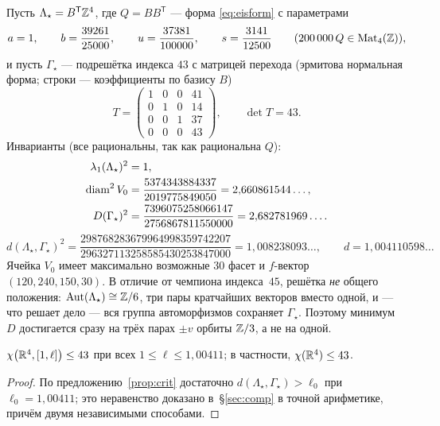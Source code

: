 Пусть $\Lambda_\star=B^{\mathsf T}\mathbb{Z}^4$, где $Q=BB^{\mathsf T}$ --- форма
\eqref{eq:eisform} с параметрами
\begin{equation}\label{eq:gram43}
a=1,\qquad b=\frac{39261}{25000},\qquad u=\frac{37381}{100000},\qquad
s=\frac{3141}{12500}
\qquad(200\,000\,Q\in\mathrm{Mat}_4(\mathbb{Z})),
\end{equation}
и пусть $\Gamma_\star$ --- подрешётка индекса $43$ с матрицей перехода
(эрмитова нормальная форма; строки --- коэффициенты по базису $B$)
\begin{equation}\label{eq:hnf43}
T=\begin{pmatrix}1&0&0&41\\0&1&0&14\\0&0&1&37\\0&0&0&43\end{pmatrix},
\qquad\det T=43 .
\end{equation}
Инварианты (все рациональны, так как рациональна $Q$):
\[
\begin{aligned}
\lambda_1(\Lambda_\star)^2&=1,\\
\operatorname{diam}^2V_0&=\frac{5374343884337}{2019775849050}
  =2{,}660861544\ldots,\\
D(\Gamma_\star)^2&=\frac{7396075258066147}{2756867811550000}
  =2{,}682781969\ldots.
\end{aligned}
\]
\[
d(\Lambda_\star,\Gamma_\star)^2
=\frac{298768283679964998359742207}{296327113258585430253847000}
=1{,}008238093\ldots,\qquad
d=1{,}004110598\ldots
\]
Ячейка $V_0$ имеет максимально возможные $30$ фасет и $f$-вектор
$(120,240,150,30)$. В отличие от чемпиона индекса~$45$, решётка
\emph{не} общего положения: $\mathrm{Aut}(\Lambda_\star)\cong\mathbb{Z}/6$, три пары
кратчайших векторов вместо одной, и --- что решает дело --- вся группа
автоморфизмов сохраняет $\Gamma_\star$. Поэтому минимум $D$ достигается сразу
на трёх парах $\pm v$ орбиты $\mathbb{Z}/3$, а не на одной.

\begin{keybox}
\begin{theorem}\label{thm:main43}
$\chi\bigl(\mathbb{R}^4,[1,\ell]\bigr)\le43$ при всех $1\le\ell\le1{,}00411$;
в частности, $\chi(\mathbb{R}^4)\le43$.
\end{theorem}
\end{keybox}
\begin{proof}
По предложению~\ref{prop:crit} достаточно
$d(\Lambda_\star,\Gamma_\star)>\ell_0$ при $\ell_0=1{,}00411$; это неравенство
доказано в~\S\ref{sec:comp} в точной арифметике, причём двумя независимыми
способами.
\end{proof}

